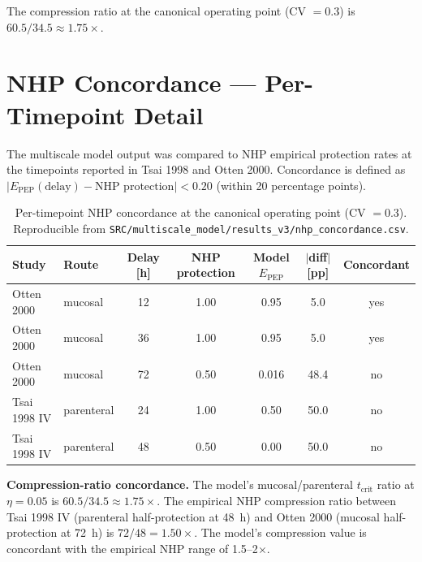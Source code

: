 \documentclass[11pt]{article}
\theoremstyle{definition}
\theoremstyle{remark}
\newcommand{\Epep}{E_{\text{PEP}}}
\newcommand{\tcrit}{t_{\text{crit}}}
\begin{document}
The compression ratio at the canonical operating point (CV $= 0.3$) is $60.5/34.5 \approx 1.75\times$.

\section{NHP Concordance --- Per-Timepoint Detail}

The multiscale model output was compared to NHP empirical protection rates at the timepoints reported in Tsai 1998\cite{tsai1995_si} and Otten 2000\cite{otten2000_si}. Concordance is defined as $|\Epep(\text{delay}) - \text{NHP protection}| < 0.20$ (within 20 percentage points).

\begin{table}[H]
\centering
\small
\caption{Per-timepoint NHP concordance at the canonical operating point (CV $= 0.3$). Reproducible from \texttt{SRC/multiscale\_model/results\_v3/nhp\_concordance.csv}.}
\begin{tabular}{@{}llccccc@{}}
\toprule
\textbf{Study} & \textbf{Route} & \textbf{Delay [h]} & \textbf{NHP protection} & \textbf{Model $\Epep$} & \textbf{$|$diff$|$ [pp]} & \textbf{Concordant} \\
\midrule
Otten 2000      & mucosal    & 12 & 1.00 & 0.95 & 5.0  & yes \\
Otten 2000      & mucosal    & 36 & 1.00 & 0.95 & 5.0  & yes \\
Otten 2000      & mucosal    & 72 & 0.50 & 0.016 & 48.4 & no  \\
Tsai 1998 IV    & parenteral & 24 & 1.00 & 0.50 & 50.0 & no  \\
Tsai 1998 IV    & parenteral & 48 & 0.50 & 0.00 & 50.0 & no  \\
\bottomrule
\end{tabular}
\end{table}

\textbf{Compression-ratio concordance.} The model's mucosal/parenteral $\tcrit$ ratio at $\eta = 0.05$ is $60.5/34.5 \approx 1.75\times$. The empirical NHP compression ratio between Tsai 1998 IV (parenteral half-protection at 48~h) and Otten 2000 (mucosal half-protection at 72~h) is $72/48 = 1.50\times$. The model's compression value is concordant with the empirical NHP range of 1.5--2$\times$.
\end{document}
